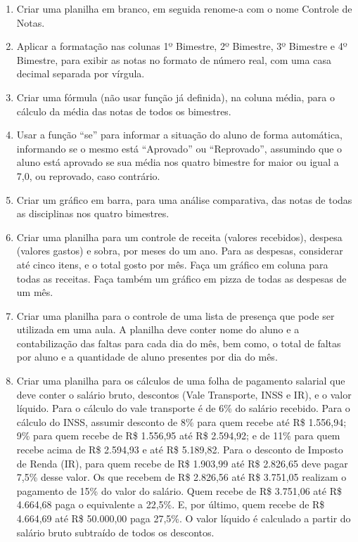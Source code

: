 \documentclass[11pt]{article}
\begin{document}
	\begin{enumerate}
		\item Criar uma planilha em branco, em seguida renome-a com o nome Controle de Notas.
		\item Aplicar a formatação nas colunas 1º Bimestre, 2º Bimestre, 3º Bimestre e 4º Bimestre, para exibir as notas no formato de número real, com uma casa decimal separada por vírgula.
		\item Criar uma fórmula (não usar função já definida), na coluna média, para o cálculo da média das notas de todos os bimestres.
		\item Usar a função “se” para informar a situação do aluno de forma automática, informando se o mesmo está “Aprovado” ou “Reprovado”, assumindo que o aluno está aprovado se sua média nos quatro bimestre for maior ou igual a 7,0, ou reprovado, caso contrário.
		\item Criar um gráfico em barra, para uma análise comparativa, das notas de todas as disciplinas nos quatro bimestres.
		\item Criar uma planilha para um controle de receita (valores recebidos), despesa (valores gastos) e sobra, por meses do um ano. Para as despesas, considerar até cinco itens, e o total gosto por mês. Fa\c ca um gráfico em coluna para todas as receitas. Fa\c ca também um gráfico em pizza de todas as despesas de um mês.
		\item Criar uma planilha para o controle de uma lista de presen\c ca que pode ser utilizada em uma aula. A planilha deve conter nome do aluno e a contabiliza\c cão das faltas para cada dia do mês, bem como, o total de faltas por aluno e a quantidade de aluno presentes por dia do mês.
		\item Criar uma planilha para os cálculos de uma folha de pagamento salarial que deve conter o salário bruto, descontos (Vale Transporte, INSS e IR), e o valor líquido. Para o cálculo do vale transporte é de 6\% do salário recebido. Para o cálculo do INSS, assumir desconto de 8\% para quem recebe até R\$ 1.556,94; 9\% para quem recebe de R\$ 1.556,95 até R\$ 2.594,92; e de 11\% para quem recebe acima de R\$ 2.594,93 e até R\$ 5.189,82. Para o desconto de Imposto de Renda (IR), para quem recebe de R\$ 1.903,99 até R\$ 2.826,65 deve pagar 7,5\% desse valor. Os que recebem de R\$ 2.826,56 até R\$ 3.751,05 realizam o pagamento de 15\% do valor do salário. Quem recebe de R\$ 3.751,06 até R\$ 4.664,68 paga o equivalente a 22,5\%. E, por último, quem recebe de R\$ 4.664,69 até R\$ 50.000,00 paga 27,5\%. O valor líquido é calculado a partir do salário bruto subtraído de todos os descontos.
	\end{enumerate}
\end{document}

